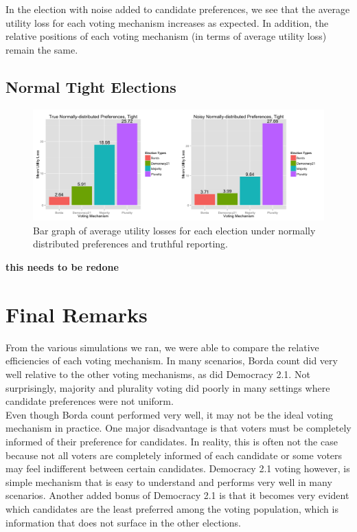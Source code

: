 \documentclass[11pt]{scrartcl}
\begin{document}
In the election with noise added to candidate preferences, we see that the average utility loss for each voting mechanism increases as expected. In addition, the relative positions of each voting mechanism (in terms of average utility loss) remain the same. 

\subsection{Normal Tight Elections}

\begin{figure}[H]\center
\includegraphics[scale=0.38]{normal_tight_noisy.png}
\caption{Bar graph of average utility losses for each election under normally distributed preferences and truthful reporting.}
\end{figure}

\textbf{this needs to be redone}


\section{Final Remarks}

From the various simulations we ran, we were able to compare the relative efficiencies of each voting mechanism. In many scenarios, Borda count did very well relative to the other voting mechanisms, as did Democracy 2.1. Not surprisingly, majority and plurality voting did poorly in many settings where candidate preferences were not uniform.\\

Even though Borda count performed very well, it may not be the ideal voting mechanism in practice. One major disadvantage is that voters must be completely informed of their preference for candidates. In reality, this is often not the case because not all voters are completely informed of each candidate or some voters may feel indifferent between certain candidates. Democracy 2.1 voting however, is simple mechanism that is easy to understand and performs very well in many scenarios. Another added bonus of Democracy 2.1 is that it becomes very evident which candidates are the least preferred among the voting population, which is information that does not surface in the other elections. 
\end{document}
